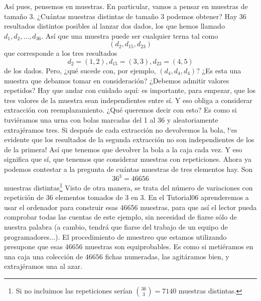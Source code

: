 \begin{ejemplo}
    Así pues, pensemos en muestras. En particular, vamos a pensar en muestras de tamaño 3. ¿Cuántas
    muestras distintas de tamaño 3 podemos obtener? Hay 36 resultados distintos posibles al lanzar
    dos dados, los que hemos llamado $d_1,d_2,\ldots,d_{36}$.  Así que una muestra puede ser
    cualquier terna tal como
        \[(d_2,d_{15},d_{23})\]
    que corresponde a los tres resultados
        \[d_2=(1,2), d_{15}=(3,3), d_{23}=(4,5)\]
    de los dados. Pero, ¿qué sucede con, por ejemplo, $(d_4,d_4,d_4)$? ¿Es esta una muestra que
    debamos tomar en consideración? ¿Debemos admitir valores repetidos? Hay que andar con cuidado
    aquí: es importante, para empezar, que los tres valores de la muestra sean independientes entre
    sí. Y eso obliga a considerar extracción con reemplazamiento. ¿Qué queremos decir con esto? Es
    como si tuviéramos una urna con bolas marcadas del 1 al 36 y aleatoriamente extrajéramos tres.
    Si después de cada extracción no devolvemos la bola, {!`}es evidente que los resultados de la
    segunda extracción no son independientes de los de la primera! Así que tenemos que devolver la
    bola a la caja cada vez. Y eso significa que sí, que tenemos que considerar muestras con
    repeticiones. Ahora ya podemos contestar a la pregunta de cuántas muestras de tres elementos
    hay. Son
    \[36^3=46656\]
    muestras distintas\footnote{Si no incluimos las repeticiones serían $\binom{36}{3}=7140$
    muestras distintas.} Visto de otra manera, se trata del número de variaciones con repetición de
    $36$ elementos tomados de $3$ en $3$. En el Tutorial06 aprenderemos a usar el ordenador para construir esas 46656 muestras, para que así el lector pueda comprobar todas las cuentas de este ejemplo,
    sin necesidad de fiarse sólo de nuestra palabra (a cambio, tendrá que fiarse del trabajo de un equipo de  programadores...). El procedimiento de muestreo que estamos utilizando presupone que {\sf
    esas $46656$ muestras son equiprobables.} Es como si metiéramos en una caja una colección de
    $46656$ fichas numeradas, las agitáramos bien, y extrajéramos una al azar.


\end{ejemplo}
